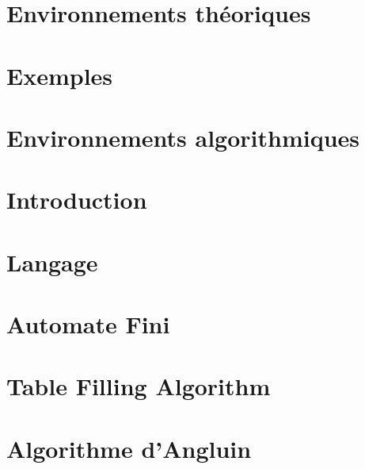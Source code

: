 

\newcommand{\student}{Benjamin André}
\newcommand{\grade}{MAB2 Sciences Informatiques}
\newcommand{\director}{Véronique Bruyère}
\renewcommand{\title}{Automates}
\renewcommand{\date}{\today}


	
		
	
	\tableofcontents
	\newpage
	
	\section*{Environnements théoriques}
	
	\section*{Exemples}
	
	\section*{Environnements algorithmiques}
	
	\newpage
	
	\section{Introduction}\label{sec:intro}
	
	
	\section{Langage}\label{sec:langage}
	\section{Automate Fini}\label{sec:automaton}
	\section{Table Filling Algorithm}\label{sec:tfa}
	\section{Algorithme d'Angluin}\label{sec:angluin}
	
	\newpage
	
	
	
